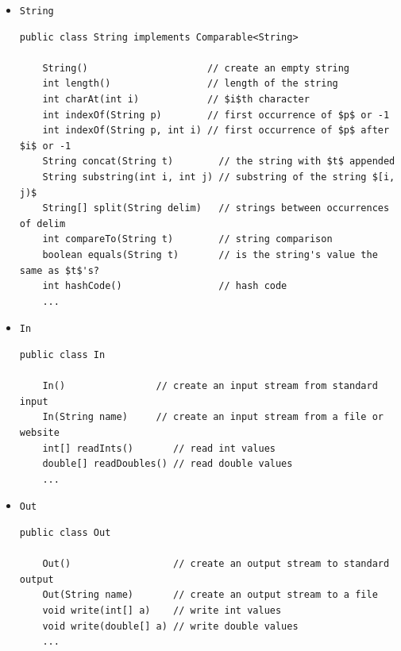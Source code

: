 \documentclass[8pt,a4paper,compress]{beamer}
\begin{document}
\begin{frame}[fragile]
\begin{itemize}
\item \lstinline{String}

\begin{lstlisting}[language={},mathescape]
public class String implements Comparable<String>

    String()                     // create an empty string
    int length()                 // length of the string
    int charAt(int i)            // $i$th character
    int indexOf(String p)        // first occurrence of $p$ or -1
    int indexOf(String p, int i) // first occurrence of $p$ after $i$ or -1
    String concat(String t)        // the string with $t$ appended
    String substring(int i, int j) // substring of the string $[i, j)$
    String[] split(String delim)   // strings between occurrences of delim
    int compareTo(String t)        // string comparison
    boolean equals(String t)       // is the string's value the same as $t$'s?
    int hashCode()                 // hash code
    ...
\end{lstlisting}

\item \lstinline{In}
\begin{lstlisting}[language={},mathescape]
public class In

    In()                // create an input stream from standard input
    In(String name)     // create an input stream from a file or website
    int[] readInts()       // read int values
    double[] readDoubles() // read double values
    ...
\end{lstlisting}

\item \lstinline{Out}
\begin{lstlisting}[language={},mathescape]
public class Out

    Out()                  // create an output stream to standard output
    Out(String name)       // create an output stream to a file
    void write(int[] a)    // write int values
    void write(double[] a) // write double values
    ...
\end{lstlisting}
\end{itemize}
\end{frame}
\end{document}
